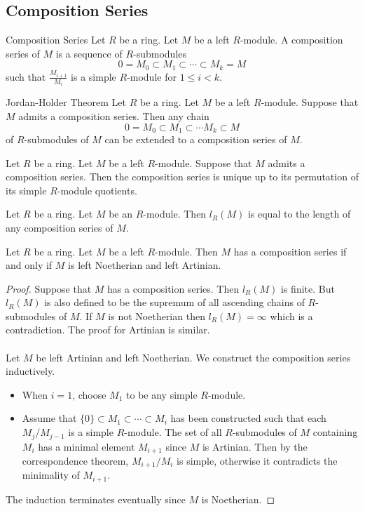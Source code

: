 \documentclass[a4paper]{article}
\begin{document}
\subsection{Composition Series}
\begin{defn}{Composition Series}{} Let $R$ be a ring. Let $M$ be a left $R$-module. A composition series of $M$ is a sequence of $R$-submodules $$0=M_0\subset M_1\subset\cdots\subset M_k=M$$ such that $\frac{M_{i+1}}{M_i}$ is a simple $R$-module for $1\leq i<k$. 
\end{defn}

\begin{thm}{Jordan-Holder Theorem}{} Let $R$ be a ring. Let $M$ be a left $R$-module. Suppose that $M$ admits a composition series. Then any chain $$0=M_0\subset M_1\subset\cdots M_k\subset M$$ of $R$-submodules of $M$ can be extended to a composition series of $M$. 
\end{thm}

\begin{prp}{}{} Let $R$ be a ring. Let $M$ be a left $R$-module. Suppose that $M$ admits a composition series. Then the composition series is unique up to its permutation of its simple $R$-module quotients. 
\end{prp}

\begin{prp}{}{} Let $R$ be a ring. Let $M$ be an $R$-module. Then $l_R(M)$ is equal to the length of any composition series of $M$. 
\end{prp}

\begin{prp}{}{} Let $R$ be a ring. Let $M$ be a left $R$-module. Then $M$ has a composition series if and only if $M$ is left Noetherian and left Artinian. 
\begin{proof}
Suppose that $M$ has a composition series. Then $l_R(M)$ is finite. But $l_R(M)$ is also defined to be the supremum of all ascending chains of $R$-submodules of $M$. If $M$ is not Noetherian then $l_R(M)=\infty$ which is a contradiction. The proof for Artinian is similar. \\~\\

Let $M$ be left Artinian and left Noetherian. We construct the composition series inductively. 
\begin{itemize}
\item When $i=1$, choose $M_1$ to be any simple $R$-module. 
\item Assume that $\{0\}\subset M_1\subset\cdots\subset M_i$ has been constructed such that each $M_j/M_{j-1}$ is a simple $R$-module. The set of all $R$-submodules of $M$ containing $M_i$ has a minimal element $M_{i+1}$ since $M$ is Artinian. Then by the correspondence theorem, $M_{i+1}/M_i$ is simple, otherwise it contradicts the minimality of $M_{i+1}$. 
\end{itemize}
The induction terminates eventually since $M$ is Noetherian. 
\end{proof}
\end{prp}
\end{document}
